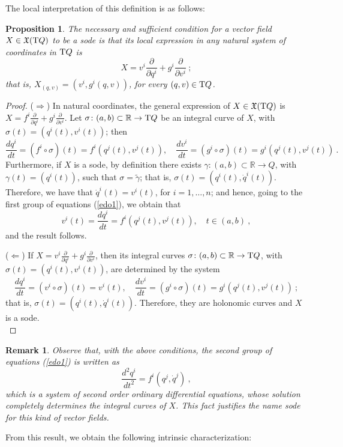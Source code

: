 \documentclass[12pt]{report}
\newtheorem{prop}[teor]{Proposition}
\newtheorem{remark}[teor]{Remark}
\def\beq{\begin{equation}}
\def\eeq{\end{equation}}
\def\dst{\displaystyle}
\def\derpar#1#2{\frac{\partial{#1}}{\partial{#2}}}
\def\qed{\ifvmode\removelastskip\fi
{\unskip\nobreak\hfil\penalty50\hbox{}\nobreak\hfil
\hbox{\vrule height1.2ex width1.2ex}\parfillskip=0pt
\finalhyphendemerits=0 \par\smallskip}}
\def\vf{\mathfrak X}
\def\Real{\mathbb{R}}
\def\Tan{{\rm T}}
\begin{document}
The local interpretation of this definition is as follows:

\begin{prop}
The necessary and sufficient condition for a vector field
$X\in\vf(\Tan Q)$ to be a {\sc sode} is that its local expression
in any natural system of coordinates in $\Tan Q$ is
\beq
X=v^i\derpar{}{q^i}+g^i\derpar{}{v^i} \ ;
\label{cvedso}
\eeq
that is,
$X_{(q,v)}=(v^i,g^i(q,v))$, for every $(q,v)\in\Tan Q$.
\end{prop}
\begin{proof}
($\Longrightarrow$)\quad
In natural coordinates, the general expression of $X\in\vf(\Tan Q)$ is
\(\dst X=f^i\derpar{}{q^i}+g^i\derpar{}{v^i}\).
Let $\sigma\colon (a,b)\subset\Real\to \Tan Q$
be an integral curve of $X$, with $\sigma(t)=(q^i(t),v^i(t))$; then
\beq
\frac{d q^i}{d t}=(f^i\circ\sigma)(t)=f^i(q^j(t),v^j(t))
,\quad
\frac{d v^i}{d t}=(g^i\circ\sigma)(t)=g^i(q^j(t),v^j(t)) \ .
\label{edo1}
\eeq
Furthermore, if $X$ is a {\sc sode}, by definition there exists
$\gamma\colon (a,b)\subset\Real\to Q$, with $\gamma(t)=(q^i(t))$,
such that $\sigma=\widetilde  \gamma$; that is,
$\sigma(t)=(q^i(t),\dot q^i(t))$.
Therefore, we have that $\dot q^i(t)=v^i(t)$, for $i=1,\ldots ,n$;
and hence, going to the first group of equations (\ref{edo1}), we obtain that
$$
v^i(t)=\frac{d q^i}{d t}=f^i(q^j(t),v^j(t)) ,\quad t\in (a,b) \ ,
$$
and the result follows.

\quad($\Longleftarrow$)\quad
If \(\dst X=v^i\derpar{}{q^i}+g^i\derpar{}{v^i}\), then its integral curves
$\sigma\colon (a,b)\subset\Real\to \Tan Q$, with $\sigma(t)=(q^i(t),v^i(t))$,
are determined by the system
$$
\frac{d q^i}{d t}=(v^i\circ\sigma)(t)=v^i(t)
,\quad
\frac{d v^i}{d t}=(g^i\circ\sigma)(t)=g^i(q^j(t),v^j(t)) \ ;
$$
that is, $\sigma(t)=(q^i(t),\dot q^i(t))$.
Therefore, they are holonomic curves and $X$ is a {\sc sode}.
\\ \qed  \end{proof}

\begin{remark}{\rm 
Observe that, with the above conditions,
the second group of equations (\ref{edo1}) is written as
$$
\frac{d^2 q^i}{d t^2}=f^i(q^j,\dot q^j) \ ,
$$
which is a system of  second order ordinary differential equations,
whose solution completely determines the integral curves of $X$.
This fact justifies the name {\sc sode} for this kind of vector fields.
}\end{remark}

From this result, we obtain the following intrinsic characterization: 
\end{document}
